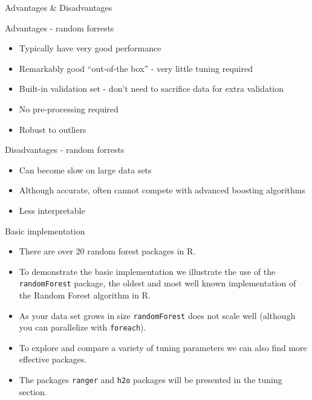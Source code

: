 \documentclass[
  10pt,
  ignorenonframetext,
]{beamer}
\providecommand{\tightlist}{%
  \setlength{\itemsep}{0pt}\setlength{\parskip}{0pt}}
\begin{document}
\begin{frame}{Advantages \& Disadvantages}
\protect\hypertarget{advantages-disadvantages}{}

\begin{block}{Advantages - random forrests}

\begin{itemize}
\tightlist
\item
  Typically have very good performance
\item
  Remarkably good ``out-of-the box'' - very little tuning required
\item
  Built-in validation set - don't need to sacrifice data for extra
  validation
\item
  No pre-processing required
\item
  Robust to outliers
\end{itemize}

\end{block}

\begin{block}{Disadvantages - random forrests}

\begin{itemize}
\tightlist
\item
  Can become slow on large data sets
\item
  Although accurate, often cannot compete with advanced boosting
  algorithms
\item
  Less interpretable
\end{itemize}

\end{block}

\end{frame}

\begin{frame}[fragile]{Basic implementation}
\protect\hypertarget{basic-implementation}{}

\begin{itemize}
\tightlist
\item
  There are over 20 random forest packages in R.
\item
  To demonstrate the basic implementation we illustrate the use of the
  \texttt{randomForest} package, the oldest and most well known
  implementation of the Random Forest algorithm in R.
\item
  As your data set grows in size \texttt{randomForest} does not scale
  well (although you can parallelize with \texttt{foreach}).
\item
  To explore and compare a variety of tuning parameters we can also find
  more effective packages.
\item
  The packages \texttt{ranger} and \texttt{h2o} packages will be
  presented in the tuning section.
\end{itemize}

\end{frame}
\end{document}
